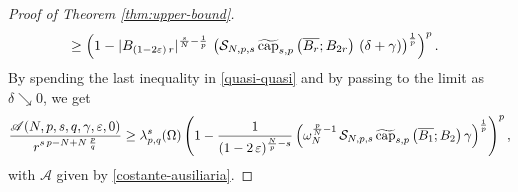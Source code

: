 \documentclass{amsart}
\theoremstyle{definition}
\numberwithin{equation}{section}
\begin{document}
\begin{proof}[Proof of Theorem \ref{thm:upper-bound}]
\begin{align*}
		&\ge \left(1- |B_{(1-2\varepsilon)\,r}|^{\frac{s}{N}  - \frac{1}{p}}\,\left(\mathcal{S}_{N,p,s}\,\widetilde{{\rm cap}}_{s,p}\left(\overline{B_r}; B_{2r}\right)\,(\delta + \gamma)\right)^{\frac{1}{p}} \right)^p.
	\end{align*}
	By spending the last inequality in \eqref{quasi-quasi} and by passing to the limit as $\delta \searrow 0$, we get
	\begin{equation}\label{ineq-final_upperbound}
		\begin{split}
			\frac{\mathscr{A}(N,p,s, q, \gamma, \varepsilon, 0)}{r^{s\,p - N + N\,\frac{p}{q}}} \ge \lambda_{p, q}^s(\Omega)\left(1- \frac{1}{(1-2\,\varepsilon)^{\frac{N}{p} -s }}\left(\omega_N^{\frac{p}{N}-1}\,\mathcal{S}_{N,p,s}\,\widetilde{{\rm cap}}_{s,p}\left(\overline{B_1}; B_{2}\right)\gamma\right)^{\frac{1}{p}}\right)^p,
		\end{split}
	\end{equation}
	with $\mathscr{A}$ given by \eqref{costante-ausiliaria}. 

\end{proof}
\end{document}
